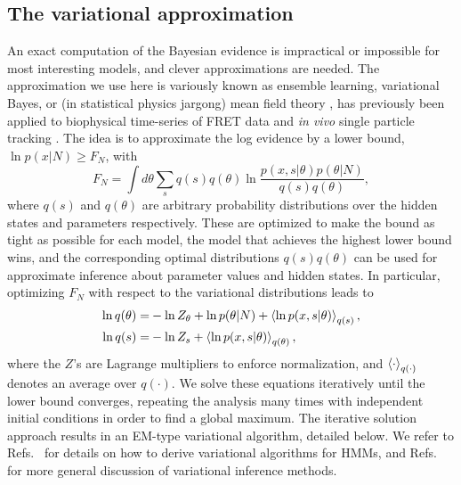 \cite{someintroductionghere}
\subsection{The variational approximation}
An exact computation of the Bayesian evidence is impractical or
impossible for most interesting models, and clever approximations are
needed. The approximation we use here is variously known as ensemble
learning, variational Bayes, or (in statistical physics jargong) mean
field theory \cite{mackay2003,bishop2006}, has previously been applied
to biophysical time-series of FRET data
\cite{bronson2009,vandemeent_manuscript,okamoto2012} and \textit{in
  vivo} single particle tracking \cite{persson2013}.  The idea is to
approximate the log evidence by a lower bound, $\ln p(x|N)\geq F_N$,
with
\begin{equation}
  F_N= \int d\theta\sum_{s} q(s)q(\theta)
  \ln\frac{p(x,s|\theta)p(\theta|N)}{q(s)q(\theta)},
\end{equation}
where $q(s)$ and $q(\theta)$ are arbitrary probability distributions
over the hidden states and parameters respectively.  These are
optimized to make the bound as tight as possible for each model, the
model that achieves the highest lower bound wins, and the
corresponding optimal distributions $q(s)q(\theta)$ can be used for
approximate inference about parameter values and hidden states. In
particular, optimizing $F_N$ with respect to the variational
distributions leads to
\begin{align}
  \ln q(\theta)=&-\ln Z_\theta+ \ln p(\theta|N)
  +\left\langle \ln p(x,s|\theta)\right\rangle_{q(s)},\label{seq:qparam}\\
  \ln q(s)=&-\ln Z_s+\left\langle \ln p(x,s|\theta)\right\rangle_{q(\theta)},\label{seq:sparam}
\end{align}
where the $Z$'s are Lagrange multipliers to enforce normalization, and
$\left\langle \cdot\right\rangle_{q(\cdot)}$ denotes an average over $q(\cdot)$. We solve
these equations iteratively until the lower bound converges, repeating
the analysis many times with independent initial conditions in order
to find a global maximum.  The iterative solution approach results in
an EM-type variational algorithm, detailed below.  We refer to
Refs.~\cite{mackay1997,beal2003,persson2013} for details on how to
derive variational algorithms for HMMs, and
Refs.~\cite{beal2003,mackay2003,bishop2006} for more general
discussion of variational inference methods.

